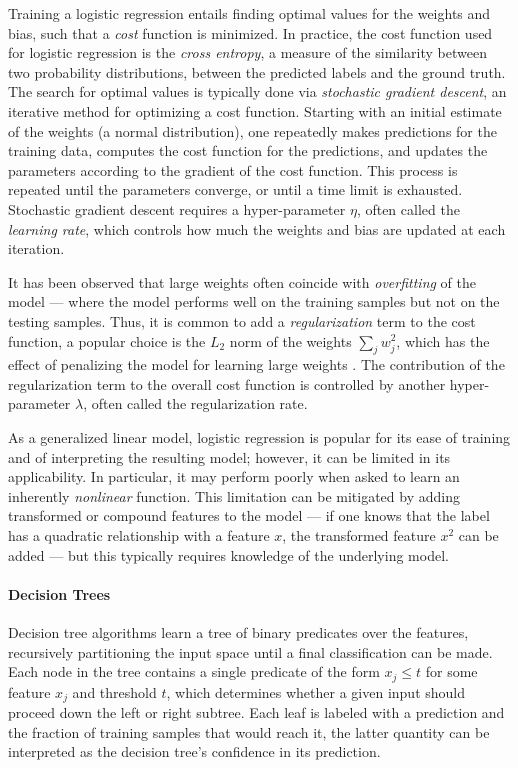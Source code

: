 Training a logistic regression entails finding optimal values for the
weights and bias, such that a \emph{cost} function is minimized.
%
In practice, the cost function used for logistic regression is the
\emph{cross entropy}, a measure of the similarity between two
probability distributions, between the predicted labels and the ground
truth.
%
The search for optimal values is typically done via \emph{stochastic
  gradient descent}, an iterative method for optimizing a cost function.
%
Starting with an initial estimate of the weights (\eg a normal
distribution), one repeatedly makes predictions for the training data,
computes the cost function for the predictions, and updates the
parameters according to the gradient of the cost function.
%
This process is repeated until the parameters converge, or until a time
limit is exhausted.
%
Stochastic gradient descent requires a hyper-parameter $\eta$, often
called the \emph{learning rate}, which controls how much the weights and
bias are updated at each iteration.

It has been observed that large weights often coincide with
\emph{overfitting} of the model --- where the model performs well on the
training samples but not on the testing samples.
%
Thus, it is common to add a \emph{regularization} term to the cost
function, a popular choice is the $L_2$ norm of the weights
$\sum_j w_j^2$, which has the effect of penalizing the model for
learning large weights \citep{Park2008-no}.
%
The contribution of the regularization term to the overall cost function
is controlled by another hyper-parameter $\lambda$, often called the
regularization rate.

As a generalized linear model, logistic regression is popular for its
ease of training and of interpreting the resulting model; however, it
can be limited in its applicability.
%
In particular, it may perform poorly when asked to learn an inherently
\emph{nonlinear} function.
%
This limitation can be mitigated by adding transformed or compound
features to the model --- \eg if one knows that the label has a
quadratic relationship with a feature $x$, the transformed feature $x^2$
can be added --- but this typically requires knowledge of the underlying
model.


\paragraph{Decision Trees}
Decision tree algorithms learn a tree of binary predicates over the
features, recursively partitioning the input space until a final
classification can be made.
%
Each node in the tree contains a single predicate of the form
$x_j \leq t$ for some feature $x_j$ and threshold $t$, which determines
whether a given input should proceed down the left or right subtree.
%
Each leaf is labeled with a prediction and the fraction of training
samples that would reach it, the latter quantity can be interpreted as
the decision tree's confidence in its prediction.

